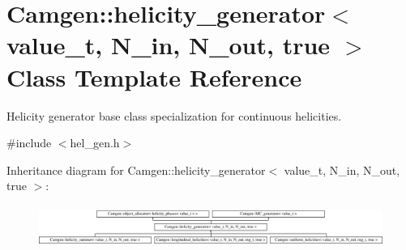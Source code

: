 \hypertarget{a00272}{}\section{Camgen\+:\+:helicity\+\_\+generator$<$ value\+\_\+t, N\+\_\+in, N\+\_\+out, true $>$ Class Template Reference}
\label{a00272}


Helicity generator base class specialization for continuous helicities.  




{\ttfamily \#include $<$hel\+\_\+gen.\+h$>$}

Inheritance diagram for Camgen\+:\+:helicity\+\_\+generator$<$ value\+\_\+t, N\+\_\+in, N\+\_\+out, true $>$\+:\begin{figure}[H]
\begin{center}
\leavevmode
\includegraphics[height=1.389578cm]{a00272}
\end{center}
\end{figure}
